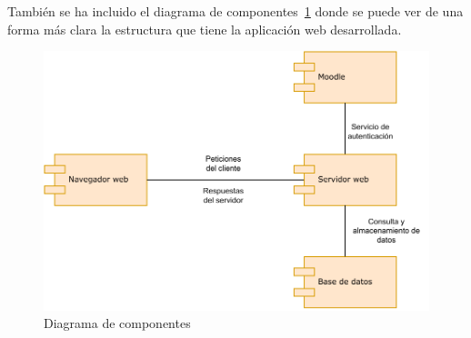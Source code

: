 También se ha incluido el diagrama de componentes~\ref{DiagramaComponentes} donde se puede ver de una forma más clara la estructura que tiene la aplicación web desarrollada.

\begin{figure}
	\centering
	\includegraphics[width=\textwidth]{../img/Anexos/Diagrama componentes.pdf}
	\caption{Diagrama de componentes}\label{DiagramaComponentes}
\end{figure}





